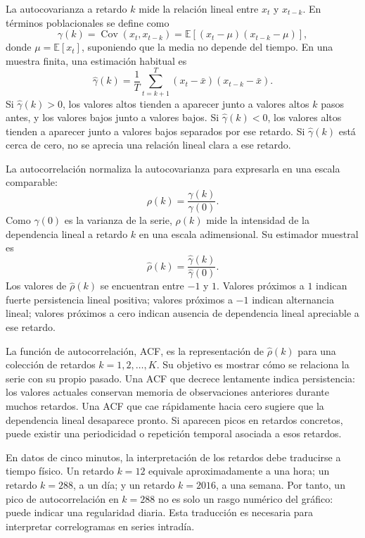 La autocovarianza a retardo \(k\) mide la relación lineal entre \(x_t\) y \(x_{t-k}\). En términos poblacionales se define como
\begin{equation}
    \gamma(k)=\operatorname{Cov}(x_t,x_{t-k})
    =\mathbb{E}\left[(x_t-\mu)(x_{t-k}-\mu)\right],
\end{equation}
donde \(\mu=\mathbb{E}[x_t]\), suponiendo que la media no depende del tiempo. En una muestra finita, una estimación habitual es
\begin{equation}
    \hat{\gamma}(k)=\frac{1}{T}\sum_{t=k+1}^{T}(x_t-\bar{x})(x_{t-k}-\bar{x}).
\end{equation}
Si \(\hat{\gamma}(k)>0\), los valores altos tienden a aparecer junto a valores altos \(k\) pasos antes, y los valores bajos junto a valores bajos. Si \(\hat{\gamma}(k)<0\), los valores altos tienden a aparecer junto a valores bajos separados por ese retardo. Si \(\hat{\gamma}(k)\) está cerca de cero, no se aprecia una relación lineal clara a ese retardo.

La autocorrelación normaliza la autocovarianza para expresarla en una escala comparable:
\begin{equation}
    \rho(k)=\frac{\gamma(k)}{\gamma(0)}.
\end{equation}
Como \(\gamma(0)\) es la varianza de la serie, \(\rho(k)\) mide la intensidad de la dependencia lineal a retardo \(k\) en una escala adimensional. Su estimador muestral es
\begin{equation}
    \hat{\rho}(k)=\frac{\hat{\gamma}(k)}{\hat{\gamma}(0)}.
\end{equation}
Los valores de \(\hat{\rho}(k)\) se encuentran entre \(-1\) y \(1\). Valores próximos a \(1\) indican fuerte persistencia lineal positiva; valores próximos a \(-1\) indican alternancia lineal; valores próximos a cero indican ausencia de dependencia lineal apreciable a ese retardo.

La función de autocorrelación, ACF, es la representación de \(\hat{\rho}(k)\) para una colección de retardos \(k=1,2,\ldots,K\). Su objetivo es mostrar cómo se relaciona la serie con su propio pasado. Una ACF que decrece lentamente indica persistencia: los valores actuales conservan memoria de observaciones anteriores durante muchos retardos. Una ACF que cae rápidamente hacia cero sugiere que la dependencia lineal desaparece pronto. Si aparecen picos en retardos concretos, puede existir una periodicidad o repetición temporal asociada a esos retardos.

En datos de cinco minutos, la interpretación de los retardos debe traducirse a tiempo físico. Un retardo \(k=12\) equivale aproximadamente a una hora; un retardo \(k=288\), a un día; y un retardo \(k=2016\), a una semana. Por tanto, un pico de autocorrelación en \(k=288\) no es solo un rasgo numérico del gráfico: puede indicar una regularidad diaria. Esta traducción es necesaria para interpretar correlogramas en series intradía.

